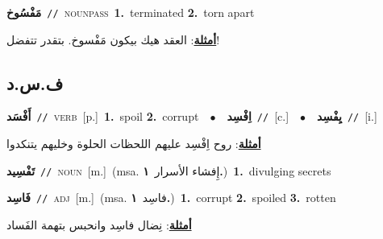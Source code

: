 \documentclass[10pt,a4paper,twoside]{article} %
\begin{document}
\begin{multicols}{2}
{\setlength\topsep{0pt}\textbf{\foreignlanguage{arabic}{مَفْسُوخ}}\ {\color{gray}\texttt{//}\color{black}}\ \textsc{noun\textunderscore pass}\ \textbf{1.}~terminated  \textbf{2.}~torn apart\  \begin{flushright}\color{gray}\foreignlanguage{arabic}{\textbf{\underline{\foreignlanguage{arabic}{أمثلة}}}: العقد هيك بيكون مَفْسوخ. بتقدر تتفضل!}\end{flushright}\color{black}} \vspace{2mm}

\vspace{-3mm}
\subsection*{\color{blue}\foreignlanguage{arabic}{ف.س.د}\color{blue}{}} 

{\setlength\topsep{0pt}\textbf{\foreignlanguage{arabic}{أَفْسَد}}\ {\color{gray}\texttt{//}\color{black}}\ \textsc{verb}\ [p.]\ \textbf{1.}~spoil  \textbf{2.}~corrupt\ \ $\bullet$\ \ \setlength\topsep{0pt}\textbf{\foreignlanguage{arabic}{اِفْسِد}}\ {\color{gray}\texttt{//}\color{black}}\ [c.]\ \ $\bullet$\ \ \setlength\topsep{0pt}\textbf{\foreignlanguage{arabic}{يِفْسِد}}\ {\color{gray}\texttt{//}\color{black}}\ [i.]\  \begin{flushright}\color{gray}\foreignlanguage{arabic}{\textbf{\underline{\foreignlanguage{arabic}{أمثلة}}}: روح اِفْسِد عليهم اللحظات الحلوة وخليهم يتنكدوا}\end{flushright}\color{black}} \vspace{2mm}

{\setlength\topsep{0pt}\textbf{\foreignlanguage{arabic}{تَفْسِيد}}\ {\color{gray}\texttt{//}\color{black}}\ \textsc{noun}\ [m.]\ \color{gray}(msa. \foreignlanguage{arabic}{إِفشاء الأسرار}~\foreignlanguage{arabic}{\textbf{١.}})\color{black}\ \textbf{1.}~divulging secrets\ } \vspace{2mm}

{\setlength\topsep{0pt}\textbf{\foreignlanguage{arabic}{فَاسِد}}\ {\color{gray}\texttt{//}\color{black}}\ \textsc{adj}\ [m.]\ \color{gray}(msa. \foreignlanguage{arabic}{فاسِد}~\foreignlanguage{arabic}{\textbf{١.}})\color{black}\ \textbf{1.}~corrupt  \textbf{2.}~spoiled  \textbf{3.}~rotten\  \begin{flushright}\color{gray}\foreignlanguage{arabic}{\textbf{\underline{\foreignlanguage{arabic}{أمثلة}}}: نِضال فاسِد وانحبس بتهمة الفَساد}\end{flushright}\color{black}} \vspace{2mm}


\end{multicols}
\end{document}
